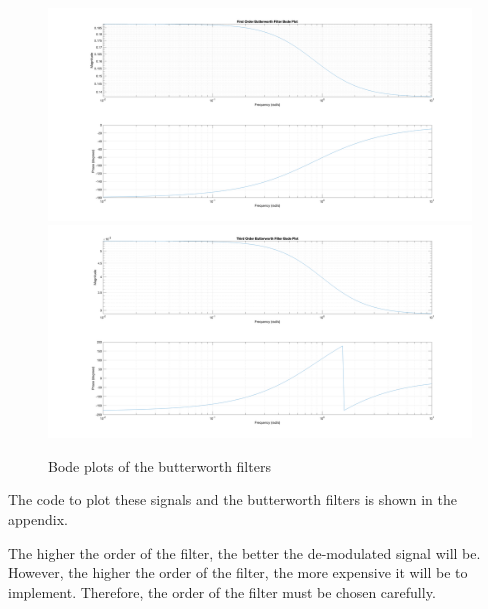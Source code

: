 \begin{figure}[H]
    \centering
    \includegraphics[width=1\textwidth]{images/prelab_problem2_firstorder.png}
    \includegraphics[width=1\textwidth]{images/prelab_problem2_thirdorder.png}
    \caption{Bode plots of the butterworth filters}
    \label{fig:bode_plots}
\end{figure}

The code to plot these signals and the butterworth filters is shown in the appendix.

The higher the order of the filter, the better the de-modulated signal will be. However, the higher the order of the filter, the more expensive it will be to implement. Therefore, the order of the filter must be chosen carefully.